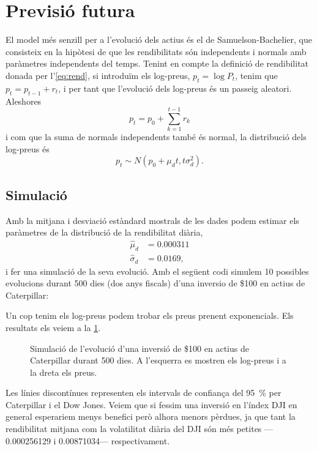 \documentclass{article}
\numberwithin{table}{section}
\numberwithin{figure}{section}
\numberwithin{equation}{section}
\begin{document}
\section{Previsió futura}
El model més senzill per a l'evolució dels actius és el de Samuelson-Bachelier, que consisteix en la hipòtesi de que les rendibilitats són independents i normals amb paràmetres independents del temps. Tenint en compte la definició de rendibilitat donada per l'\cref{eq:rend}, si introduïm els log-preus, \( p_t = \log{P_t} \), tenim que \( p_t = p_{t-1} + r_t \), i per tant que l'evolució dels log-preus és un passeig aleatori. Aleshores
\begin{equation} \label{eqn:passeig aleatori}
	p_t = p_0 + \sum_{k = 1}^{t-1}r_k 
\end{equation}
i com que la suma de normals independents també és normal, la distribució dels log-preus és
\begin{equation} \label{eqn:distribucio log-preus}
	p_t \sim N(p_0 + \mu_d t, t\sigma_d^2).
\end{equation}

\subsection{Simulació}
Amb la mitjana i desviació estàndard mostrals de les dades podem estimar els paràmetres de la distribució de la rendibilitat diària, 
\begin{equation} \label{eq:parametres}
	\begin{aligned}
		\hat{\mu}_d &= 0.000311 \\
		\hat{\sigma}_d&	= 0.0169,
	\end{aligned}
\end{equation}
i fer una simulació de la seva evolució. Amb el següent codi simulem 10 possibles evolucions durant 500 dies (dos anys fiscals) d'una inversio de \$100 en actius de Caterpillar:

Un cop tenim els log-preus podem trobar els preus prenent exponencials. Els resultats els veiem a la \cref{fig:simulacio}.
\begin{figure}[htb]
	\centering \sffamily \small
	
	\caption{Simulació de l'evolució d'una inversió de \$100 en actius de Caterpillar durant 500 dies. A l'esquerra es mostren els log-preus i a la dreta els preus.}
	\label{fig:simulacio}
\end{figure}
Les línies discontínues representen els intervals de confiança del \SI{95}{\percent} per Caterpillar i el Dow Jones. Veiem que si fessim una inversió en l'índex DJI en general esperariem menys benefici però alhora menors pèrdues, ja que tant la rendibilitat mitjana com la volatilitat diària del DJI són més petites ---\num{0.000256129} i \num{0.00871034}--- respectivament.
\end{document}
